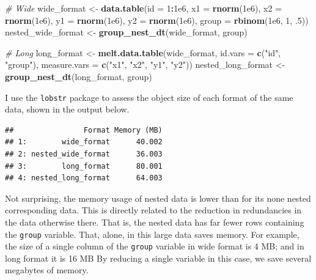 \documentclass[doc,floatsintext]{apa6}
\newenvironment{Shaded}{\begin{snugshade}}{\end{snugshade}}
\newcommand{\CommentTok}[1]{\textcolor[rgb]{0.56,0.35,0.01}{\textit{#1}}}
\newcommand{\DataTypeTok}[1]{\textcolor[rgb]{0.13,0.29,0.53}{#1}}
\newcommand{\DecValTok}[1]{\textcolor[rgb]{0.00,0.00,0.81}{#1}}
\newcommand{\FloatTok}[1]{\textcolor[rgb]{0.00,0.00,0.81}{#1}}
\newcommand{\KeywordTok}[1]{\textcolor[rgb]{0.13,0.29,0.53}{\textbf{#1}}}
\newcommand{\NormalTok}[1]{#1}
\newcommand{\OperatorTok}[1]{\textcolor[rgb]{0.81,0.36,0.00}{\textbf{#1}}}
\newcommand{\StringTok}[1]{\textcolor[rgb]{0.31,0.60,0.02}{#1}}
\begin{document}
\begin{Shaded}
\begin{Highlighting}[]
\CommentTok{# Wide}
\NormalTok{wide_format <-}\StringTok{ }\KeywordTok{data.table}\NormalTok{(}\DataTypeTok{id =} \DecValTok{1}\OperatorTok{:}\FloatTok{1e6}\NormalTok{,}
                          \DataTypeTok{x1 =} \KeywordTok{rnorm}\NormalTok{(}\FloatTok{1e6}\NormalTok{),}
                          \DataTypeTok{x2 =} \KeywordTok{rnorm}\NormalTok{(}\FloatTok{1e6}\NormalTok{),}
                          \DataTypeTok{y1 =} \KeywordTok{rnorm}\NormalTok{(}\FloatTok{1e6}\NormalTok{),}
                          \DataTypeTok{y2 =} \KeywordTok{rnorm}\NormalTok{(}\FloatTok{1e6}\NormalTok{),}
                          \DataTypeTok{group =} \KeywordTok{rbinom}\NormalTok{(}\FloatTok{1e6}\NormalTok{, }\DecValTok{1}\NormalTok{, }\FloatTok{.5}\NormalTok{))}
\NormalTok{nested_wide_format <-}\StringTok{ }\KeywordTok{group_nest_dt}\NormalTok{(wide_format, group)}

\CommentTok{# Long}
\NormalTok{long_format <-}\StringTok{ }\KeywordTok{melt.data.table}\NormalTok{(wide_format, }
                               \DataTypeTok{id.vars =} \KeywordTok{c}\NormalTok{(}\StringTok{"id"}\NormalTok{, }\StringTok{"group"}\NormalTok{),}
                               \DataTypeTok{measure.vars =} \KeywordTok{c}\NormalTok{(}\StringTok{"x1"}\NormalTok{, }\StringTok{"x2"}\NormalTok{, }\StringTok{"y1"}\NormalTok{, }\StringTok{"y2"}\NormalTok{))}
\NormalTok{nested_long_format <-}\StringTok{ }\KeywordTok{group_nest_dt}\NormalTok{(long_format, group)}
\end{Highlighting}
\end{Shaded}

I use the \texttt{lobstr} package to assess the object size of each format of the same data, shown in the output below.

\begin{verbatim}
##                Format Memory (MB)
## 1:        wide_format      40.002
## 2: nested_wide_format      36.003
## 3:        long_format      80.001
## 4: nested_long_format      64.003
\end{verbatim}

Not surprising, the memory usage of nested data is lower than for its none nested corresponding data. This is directly related to the reduction in redundancies in the data otherwise there. That is, the nested data has far fewer rows containing the \texttt{group} variable. That, alone, in this large data saves memory. For example, the size of a single column of the \texttt{group} variable in wide format is 4 MB; and in long format it is 16 MB By reducing a single variable in this case, we save several megabytes of memory.
\end{document}
